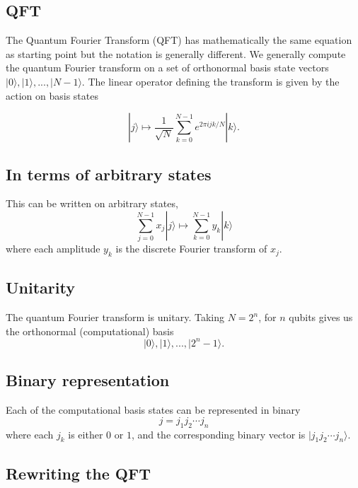 \documentclass[%
oneside,                 %
final,                   %
10pt]{article}
\begin{document}


\subsection{QFT}

The Quantum Fourier Transform (QFT) has mathematically the same equation as starting point
but the notation is generally different. We generally compute the
quantum Fourier transform on a set of orthonormal basis state vectors
\(|0\rangle, |1\rangle, ..., |N-1\rangle\). The linear operator defining
the transform is given by the action on basis states

\[
|j\rangle \mapsto \frac{1}{\sqrt{N}} \sum_{k=0}^{N-1} e^{2\pi ijk/N}|k\rangle.
\]

\subsection{In terms of arbitrary states}

This can be written on arbitrary states,
\[
\sum_{j=0}^{N-1}x_j|j\rangle \mapsto \sum_{k=0}^{N-1} y_k|k\rangle
\]
where each amplitude \(y_k\) is the discrete Fourier transform of
\(x_j\).

\subsection{Unitarity}

The quantum Fourier transform is unitary. Taking \(N = 2^n\),
for \(n\) qubits gives us the orthonormal (computational) basis
\[
|0\rangle, |1\rangle, ..., |2^{n}-1\rangle.
\]

\subsection{Binary representation}

Each of the computational basis states can be represented in binary
\[
j = j_1j_2 \cdots j_n
\]
where each \(j_k\) is either \(0\) or \(1\), and the corresponding
binary vector is \(|j_1j_2 \cdots j_n\rangle\).

\subsection{Rewriting the QFT}
\end{document}

